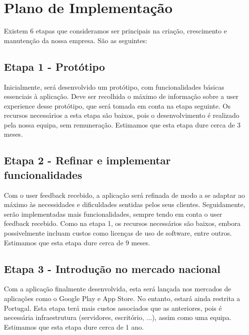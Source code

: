 \documentclass[11pt]{article}
\begin{document}
	\pagebreak
	
	\large
	\section{Plano de Implementação}
	
	\normalsize

	Existem 6 etapas que consideramos ser principais na criação, crescimento e manutenção da nossa empresa. São as seguintes:
	
	\large
	\subsection{Etapa 1 - Protótipo}
	\normalsize
	
	Inicialmente, será desenvolvido um protótipo, com funcionalidades básicas essenciais à aplicação. Deve ser recolhida o máximo de informação sobre a user experience desse protótipo, que será tomada em conta na etapa seguinte. Os recursos necessários a esta etapa são baixos, pois o desenvolvimento é realizado pela nossa equipa, sem remuneração. Estimamos que esta etapa dure cerca de 3 meses.
	
	\large
	\subsection{Etapa 2 - Refinar e implementar funcionalidades}
	\normalsize
	
	Com o user feedback recebido, a aplicação será refinada de modo a se adaptar ao máximo às necessidades e dificuldades sentidas pelos seus clientes. Seguidamente, serão implementadas mais funcionalidades, sempre tendo em conta o user feedback recebido. Como na etapa 1, os recursos necessários são baixos, embora possivelmente incluam custos como licenças de uso de software, entre outros. Estimamos que esta etapa dure cerca de 9 meses.
	
	\large
	\subsection{Etapa 3 - Introdução no mercado nacional}
	\normalsize
	
	Com a aplicação finalmente desenvolvida, esta será lançada nos mercados de aplicações como o Google Play e App Store. No entanto, estará ainda restrita a Portugal. Esta etapa terá mais custos associados que as anteriores, pois é necessária infraestrutura (servidores, escritório, ...), assim como uma equipa. Estimamos que esta etapa dure cerca de 1 ano.
	
\end{document}
